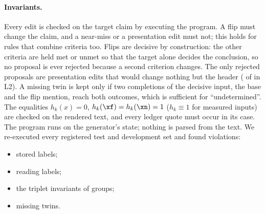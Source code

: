 \paragraph{Invariants.}
Every edit is checked on the target claim by executing the program. A flip must change the claim, and a
near-miss or a presentation edit must not; this holds for rules that combine criteria too. Flips are
decisive by construction: the other criteria are held met or unmet so that the target alone decides the
conclusion, so no proposal is ever rejected because a second criterion changes. The only rejected proposals
are presentation edits that would change nothing but the header
( of  in
L2). A missing twin is kept only if two completions of the decisive input, the base and the flip mention,
reach both outcomes, which is sufficient for ``undetermined''. The equalities $h_k(x)=0$,
$h_k(\xf)=h_k(\xn)=1$ ($h_k\equiv 1$ for measured inputs) are checked on the rendered text, and every ledger
quote must occur in its case. The program runs on the generator's state; nothing is parsed from the text.
We re-executed every registered test and development set and found
 violations:
\begin{itemize}
\item {} stored labels;
\item {} reading labels;
\item the triplet invariants of  groups;
\item {} missing twins.
\end{itemize}

